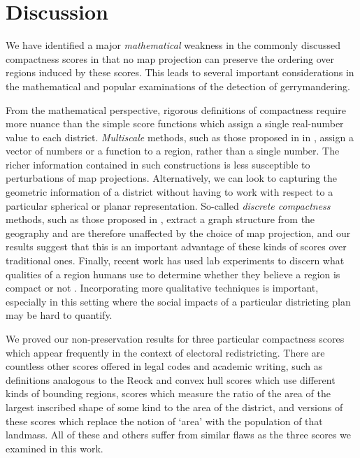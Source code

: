 \section{Discussion}



We have identified a major \textit{mathematical} weakness in the commonly discussed compactness scores in that no map projection can preserve the ordering over regions induced by these scores.  This leads to several important considerations in the mathematical and popular examinations of the detection of gerrymandering.

From the mathematical perspective, rigorous definitions of compactness require more nuance than the simple score functions which assign a single real-number value to each district.  \textit{Multiscale} methods, such as those proposed in in \cite{deford2018tv}, assign a vector of numbers or a function to a region, rather than a single number.  The richer information contained in such constructions is less susceptible to perturbations of map projections.
Alternatively, we can look to capturing the geometric information of a district without having to work with respect to a particular spherical or planar representation.  So-called \textit{discrete compactness} methods, such as those proposed in \cite{duchin2018discrete}, extract a graph structure from the geography and are therefore unaffected by the choice of map projection, and our results suggest that this is an important advantage of these kinds of scores over traditional ones.  Finally, recent work has used lab experiments to discern what qualities of a region humans use to determine whether they believe a region is compact or not \cite{kingeyeball}.  Incorporating more qualitative techniques is important, especially in this setting where the social impacts of a particular districting plan may be hard to quantify.


We proved our non-preservation results for three particular compactness scores which appear frequently in the context of electoral redistricting.  There are countless other scores offered in legal codes and academic writing, such as definitions analogous to the Reock and convex hull scores which use different kinds of bounding regions, scores which measure the ratio of the area of the largest inscribed shape of some kind to the area of the district, and versions of these scores which replace the notion of `area' with the population of that landmass.  All of these and others suffer from similar flaws as the three scores we examined in this work.

